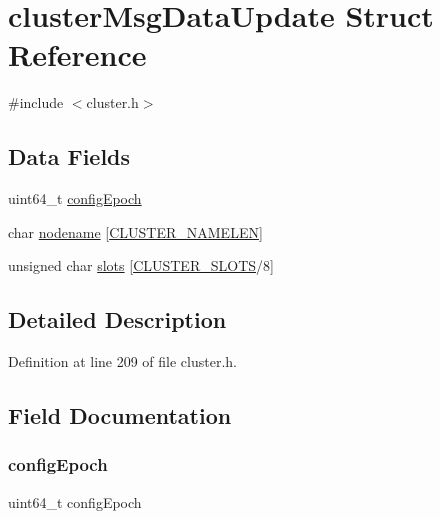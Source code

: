 \hypertarget{structcluster_msg_data_update}{}\section{cluster\+Msg\+Data\+Update Struct Reference}
\label{structcluster_msg_data_update}


{\ttfamily \#include $<$cluster.\+h$>$}

\subsection*{Data Fields}
\begin{DoxyCompactItemize}
\item 
uint64\+\_\+t \hyperlink{structcluster_msg_data_update_a6bf0844859acadf5df37a7d49595680e}{config\+Epoch}
\item 
char \hyperlink{structcluster_msg_data_update_a50eb514a773ea3e78ec45e62fc0d7b9f}{nodename} \mbox{[}\hyperlink{cluster_8h_ace7a882972eff7149675252938643b6e}{C\+L\+U\+S\+T\+E\+R\+\_\+\+N\+A\+M\+E\+L\+EN}\mbox{]}
\item 
unsigned char \hyperlink{structcluster_msg_data_update_a5860192f55932c04b85ec15307ee114b}{slots} \mbox{[}\hyperlink{cluster_8h_aa3e2cb951eebb16725ecc3f5beefd9fd}{C\+L\+U\+S\+T\+E\+R\+\_\+\+S\+L\+O\+TS}/8\mbox{]}
\end{DoxyCompactItemize}


\subsection{Detailed Description}


Definition at line 209 of file cluster.\+h.



\subsection{Field Documentation}
\mbox{\label{structcluster_msg_data_update_a6bf0844859acadf5df37a7d49595680e}} 
\subsubsection{\texorpdfstring{config\+Epoch}{configEpoch}}
{\footnotesize\ttfamily uint64\+\_\+t config\+Epoch}



